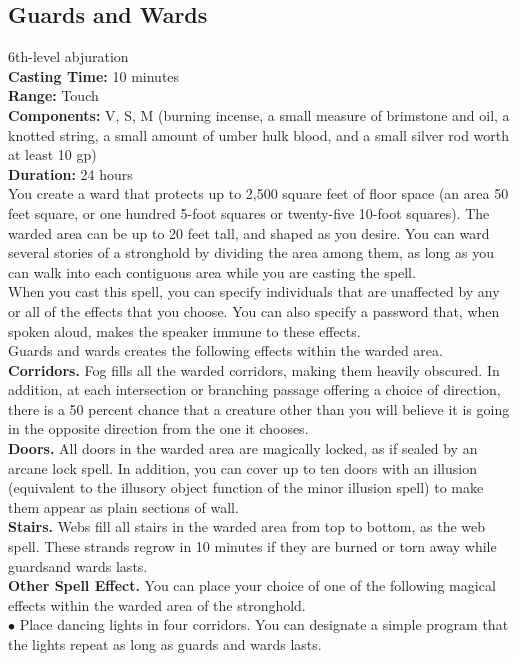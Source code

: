 \documentclass[11pt, A4paper, english]{article}
\begin{document}
		\subsection{Guards and Wards}
6th-level abjuration \\
\textbf{Casting Time:} 10 minutes \\
\textbf{Range:} Touch \\
\textbf{Components:} V, S, M (burning incense, a small measure of brimstone and oil, a knotted string, a small amount of umber hulk blood, and a small silver rod worth at least 10 gp) \\
\textbf{Duration:} 24 hours \\
You create a ward that protects up to 2,500 square feet of floor space (an area 50 feet square, or one hundred 5-foot squares or twenty-five 10-foot squares). The warded area can be up to 20 feet tall, and shaped as you desire. You can ward several stories of a stronghold by dividing the area among them, as long as you can walk into each contiguous area while you are casting the spell. \\
When you cast this spell, you can specify individuals that are unaffected by any or all of the effects that you choose. You can also specify a password that, when spoken aloud, makes the speaker immune to these effects. \\
Guards and wards creates the following effects within the warded area. \\
\textbf{Corridors.} Fog fills all the warded corridors, making them heavily obscured. In addition, at each intersection or branching passage offering a choice of direction, there is a 50 percent chance that a creature other than you will believe it is going in the opposite direction from the one it chooses. \\
\textbf{Doors.} All doors in the warded area are magically locked, as if sealed by an arcane lock spell. In addition, you can cover up to ten doors with an illusion (equivalent to the illusory object function of the minor illusion spell) to make them appear as plain sections of wall. \\
\textbf{Stairs.} Webs fill all stairs in the warded area from top to bottom, as the web spell. These strands regrow in 10 minutes if they are burned or torn away while guardsand wards lasts. \\
\textbf{Other Spell Effect.} You can place your choice of one of the following magical effects within the warded area of the stronghold. \\
\indent $\bullet$ Place dancing lights in four corridors. You can designate a simple program that the lights repeat as long as guards and wards lasts. \\
\end{document}
